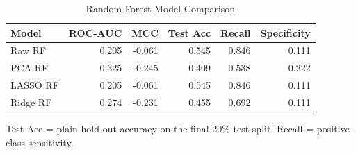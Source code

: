 \begin{table}[htbp]
\centering
\caption{Random Forest Model Comparison}
\label{tab:random\_forest\_comparison}
\begin{tabular}{lrrrrr}
\toprule
Model & ROC-AUC & MCC & Test Acc & Recall & Specificity \\
\midrule
Raw RF & 0.205 & -0.061 & 0.545 & 0.846 & 0.111 \\
PCA RF & 0.325 & -0.245 & 0.409 & 0.538 & 0.222 \\
LASSO RF & 0.205 & -0.061 & 0.545 & 0.846 & 0.111 \\
Ridge RF & 0.274 & -0.231 & 0.455 & 0.692 & 0.111 \\
\bottomrule
\end{tabular}
\par\smallskip
\footnotesize Test Acc = plain hold-out accuracy on the final 20\% test split. Recall = positive-class sensitivity.
\end{table}

